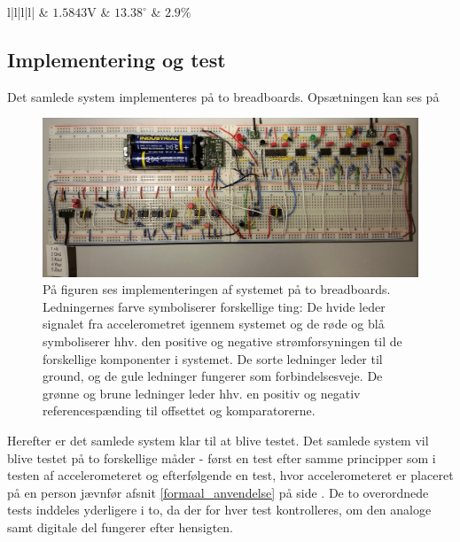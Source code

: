 \begin{table}[H]
\begin{tabular}{l|l|l|l|}
		               & $1.5843$V                                                                   & $13.38^{\circ}$                                                              & $2.9\%$                                                    \\ \hline
	\end{tabular}
	\caption{I tabellen ses resultatet af afvigelsen i det simulerede samlede system.}
	\label{tab:samlet_sim}
\end{table}

\subsection{Implementering og test}
Det samlede system implementeres på to breadboards. Opsætningen kan ses på 
\begin{figure}[H]
	\centering
	\includegraphics[scale=.22]{figures/cProblemloesning/Samlet_system2.jpg}
	\caption{På figuren ses implementeringen af systemet på to breadboards. Ledningernes farve symboliserer forskellige ting: De hvide leder signalet fra accelerometret igennem systemet og de røde og blå symboliserer hhv. den positive og negative strømforsyningen til de forskellige komponenter i systemet. De sorte ledninger leder til ground, og de gule ledninger fungerer som forbindelsesveje. De grønne og brune ledninger leder hhv. en positiv og negativ referencespænding til offsettet og komparatorerne.}
	\label{fig:samlet_system_real}
\end{figure}
\noindent Herefter er det samlede system klar til at blive testet. Det samlede system vil blive testet på to forskellige måder - først en test efter samme principper som i testen af accelerometeret og efterfølgende en test, hvor accelerometeret er placeret på en person jævnfør afsnit \ref{formaal_anvendelse} på side \pageref{formaal_anvendelse}. De to overordnede tests inddeles yderligere i to, da der for hver test kontrolleres, om den analoge samt digitale del fungerer efter hensigten.

